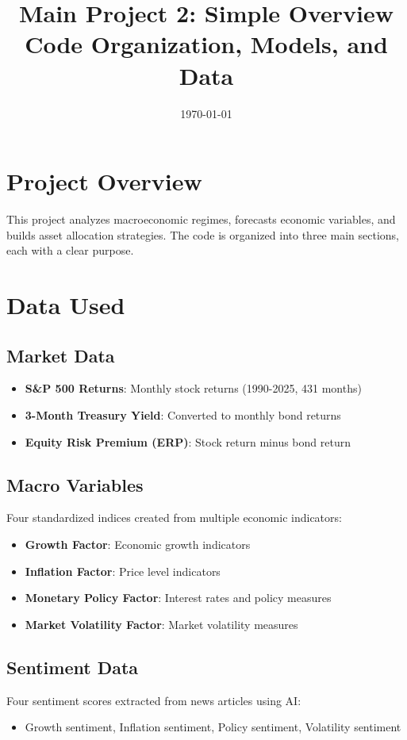 \documentclass[11pt,a4paper]{article}
\title{\textbf{Main Project 2: Simple Overview}\\
Code Organization, Models, and Data}
\author{}
\date{\today}
\begin{document}
\maketitle

\section{Project Overview}

This project analyzes macroeconomic regimes, forecasts economic variables, and builds asset allocation strategies. The code is organized into three main sections, each with a clear purpose.

\section{Data Used}

\subsection{Market Data}
\begin{itemize}
    \item \textbf{S\&P 500 Returns}: Monthly stock returns (1990-2025, 431 months)
    \item \textbf{3-Month Treasury Yield}: Converted to monthly bond returns
    \item \textbf{Equity Risk Premium (ERP)}: Stock return minus bond return
\end{itemize}

\subsection{Macro Variables}
Four standardized indices created from multiple economic indicators:
\begin{itemize}
    \item \textbf{Growth Factor}: Economic growth indicators
    \item \textbf{Inflation Factor}: Price level indicators  
    \item \textbf{Monetary Policy Factor}: Interest rates and policy measures
    \item \textbf{Market Volatility Factor}: Market volatility measures
\end{itemize}

\subsection{Sentiment Data}
Four sentiment scores extracted from news articles using AI:
\begin{itemize}
    \item Growth sentiment, Inflation sentiment, Policy sentiment, Volatility sentiment
\end{itemize}
\end{document}
